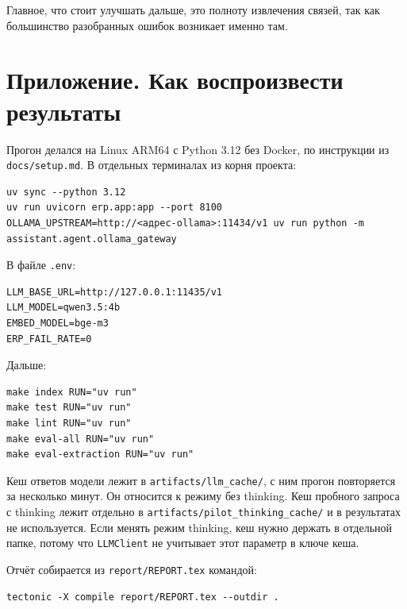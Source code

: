 \documentclass[a4paper,12pt]{article}
\newcommand{\code}[1]{\texttt{#1}}
\begin{document}
Главное, что стоит улучшать дальше, это полноту извлечения связей, так как большинство разобранных ошибок возникает именно там.

\appendix
\section*{Приложение. Как воспроизвести результаты}

Прогон делался на Linux ARM64 с Python 3.12 без Docker, по инструкции из \code{docs/setup.md}. В отдельных терминалах из корня проекта:

{\small
\begin{Verbatim}[breaklines]
uv sync --python 3.12
uv run uvicorn erp.app:app --port 8100
OLLAMA_UPSTREAM=http://<адрес-ollama>:11434/v1 uv run python -m assistant.agent.ollama_gateway
\end{Verbatim}
}

\noindent В файле \code{.env}:
{\small
\begin{Verbatim}
LLM_BASE_URL=http://127.0.0.1:11435/v1
LLM_MODEL=qwen3.5:4b
EMBED_MODEL=bge-m3
ERP_FAIL_RATE=0
\end{Verbatim}
}

\noindent Дальше:
{\small
\begin{Verbatim}
make index RUN="uv run"
make test RUN="uv run"
make lint RUN="uv run"
make eval-all RUN="uv run"
make eval-extraction RUN="uv run"
\end{Verbatim}
}

Кеш ответов модели лежит в \code{artifacts/llm\_cache/}, с ним прогон повторяется за несколько минут. Он относится к режиму без thinking. Кеш пробного запроса с thinking лежит отдельно в \code{artifacts/pilot\_thinking\_cache/} и в результатах не используется. Если менять режим thinking, кеш нужно держать в отдельной папке, потому что \code{LLMClient} не учитывает этот параметр в ключе кеша.


\noindent Отчёт собирается из \code{report/REPORT.tex} командой:
{\small
\begin{Verbatim}
tectonic -X compile report/REPORT.tex --outdir .
\end{Verbatim}
}
\end{document}
